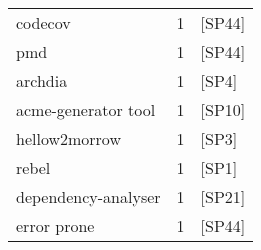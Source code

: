 \begin{tabular}{lrl}
             codecov &      1 &                                           [SP44] \\
                 pmd &      1 &                                           [SP44] \\
             archdia &      1 &                                            [SP4] \\
 acme-generator tool &      1 &                                           [SP10] \\
       hellow2morrow &      1 &                                            [SP3] \\
               rebel &      1 &                                            [SP1] \\
 dependency-analyser &      1 &                                           [SP21] \\
         error prone &      1 &                                           [SP44] \\
\bottomrule
\end{tabular}
